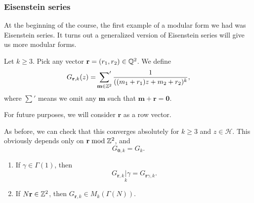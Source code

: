 \documentclass[a4paper]{article}
\renewcommand{\H}{\mathcal{H}}
\begin{document}
\subsubsection*{Eisenstein series}
At the beginning of the course, the first example of a modular form we had was Eisenstein series. It turns out a generalized version of Eisenstein series will give us more modular forms.

\begin{defi}[$G_{\mathbf{r}, k}$]
  Let $k \geq 3$. Pick any vector $\mathbf{r} = (r_1, r_2) \in \mathbb{Q}^2$. We define
  \[
    G_{\mathbf{r}, k}(z) = \sideset{}{'}\sum_{\mathbf{m} \in \mathbb{Z}^2} \frac{1}{((m_1 + r_1) z + m_2 + r_2)^k},
  \]
  where $\sum'$ means we omit any $\mathbf{m}$ such that $\mathbf{m} + \mathbf{r} = \mathbf{0}$.
\end{defi}
For future purposes, we will consider $\mathbf{r}$ as a row vector.

As before, we can check that this converges absolutely for $k \geq 3$ and $z \in \H$. This obviously depends only on $\mathbf{r} \bmod \mathbb{Z}^2$, and
\[
  G_{\mathbf{0}, k} = G_k.
\]

\begin{thm}\leavevmode
  \begin{enumerate}
    \item If $\gamma \in \Gamma(1)$, then
      \[
        G_{\mathbf{r}, k}\underset{k}{|}\gamma = G_{\mathbf{r} \gamma, k}.
      \]
    \item If $N\mathbf{r} \in \mathbb{Z}^2$, then $G_{\mathbf{r}, k} \in M_k(\Gamma(N))$.
  \end{enumerate}
\end{thm}
\end{document}
